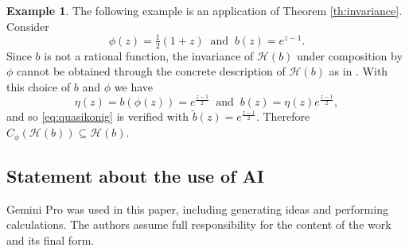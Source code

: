 \documentclass[11pt]{amsart}
\def\HH{{\mathcal H}}
\renewcommand{\subset}{\subseteq}
\numberwithin{equation}{section}
\theoremstyle{plain}
\theoremstyle{definition}
\newtheorem{example}[equation]{Example}
\begin{document}
\begin{example}
The following example is an application of Theorem \ref{th:invariance}. 
Consider $$ \phi(z)=\tfrac{1}{2}(1 + z) \; \;  \mbox{and} \; \;   b(z)=e^{z-1}.$$
Since $b$ is not a rational function, the invariance of $ \HH(b) $ under composition by $ \phi $ cannot be obtained  through the concrete description of $ \HH(b) $ as in \cite[Thm.~1.6]{MR3503356}.
With this choice of $b$ and $\phi$ we have 
	$$
	\eta(z)=b(\phi(z))=e^{\frac{z-1}{2}} \; \; \mbox{and} \; \; 
	b(z)=\eta(z)e^{\frac{z-1}{2}},
	$$
	and so \eqref{eq:quasikonig} is verified with $\widetilde{b}(z)=e^{\frac{z-1}{2}} $. Therefore $ C_\phi(\HH(b))\subset\HH(b) $.
	
	
\end{example}	

\subsection*{Statement about the use of AI} Gemini Pro was used in this paper, including generating ideas and performing calculations. The authors assume full responsibility for the content of the work and its final form. 







	
\end{document}
